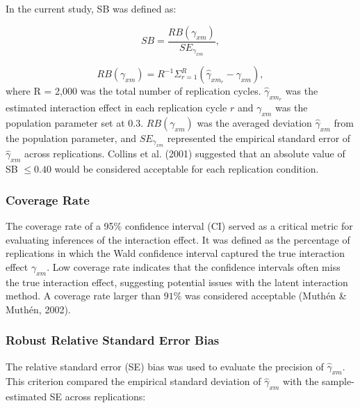 \documentclass[
  man]{apa6}
\begin{document}
In the current study, SB was defined as:

\begin{equation}
SB = \frac{RB(\gamma_{xm})}{SE_{\gamma_{xm}}},
\end{equation}

\begin{equation}
RB(\gamma_{xm}) = R^{-1}\Sigma^{R}_{r = 1}(\hat{\gamma}_{xm_{r}} - \gamma_{xm}),
\end{equation}
where R = 2,000 was the total number of replication cycles. \(\hat{\gamma}_{xm_{r}}\) was the estimated interaction effect in each replication cycle \(r\) and \(\gamma_{xm}\) was the population parameter set at 0.3. \(RB(\gamma_{xm})\) was the averaged deviation \(\hat{\gamma}_{xm}\) from the population parameter, and \(SE_{\gamma_{xm}}\) represented the empirical standard error of \(\hat{\gamma}_{xm}\) across replications. Collins et al. (2001) suggested that an absolute value of SB \(\le 0.40\) would be considered acceptable for each replication condition.

\subsubsection{Coverage Rate}\label{coverage-rate}

The coverage rate of a 95\(\%\) confidence interval (CI) served as a critical metric for evaluating inferences of the interaction effect. It was defined as the percentage of replications in which the Wald confidence interval captured the true interaction effect \(\gamma_{xm}\). Low coverage rate indicates that the confidence intervals often miss the true interaction effect, suggesting potential issues with the latent interaction method. A coverage rate larger than \(91\%\) was considered acceptable (Muthén \& Muthén, 2002).

\subsubsection{Robust Relative Standard Error Bias}\label{robust-relative-standard-error-bias}

The relative standard error (SE) bias was used to evaluate the precision of \(\hat{\gamma}_{xm}\). This criterion compared the empirical standard deviation of \(\hat{\gamma}_{xm}\) with the sample-estimated SE across replications:
\end{document}
